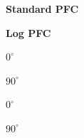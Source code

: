 \begin{figure}[!htbp]
  \centering

  \begin{minipage}{0.49\textwidth}
    \centering\textbf{Standard PFC}
  \end{minipage}\hfill
  \begin{minipage}{0.49\textwidth}
    \centering\textbf{Log PFC}
  \end{minipage}

  \vspace{2pt} %

  \begin{minipage}{0.24\textwidth}
    \centering\textbf{$0^\circ$}
  \end{minipage}\hfill
  \begin{minipage}{0.24\textwidth}
    \centering\textbf{$90^\circ$}
  \end{minipage}\hfill
  \begin{minipage}{0.24\textwidth}
    \centering\textbf{$0^\circ$}
  \end{minipage}\hfill
  \begin{minipage}{0.24\textwidth}
    \centering\textbf{$90^\circ$}
  \end{minipage}

  \vspace{2pt} %


\end{figure}
